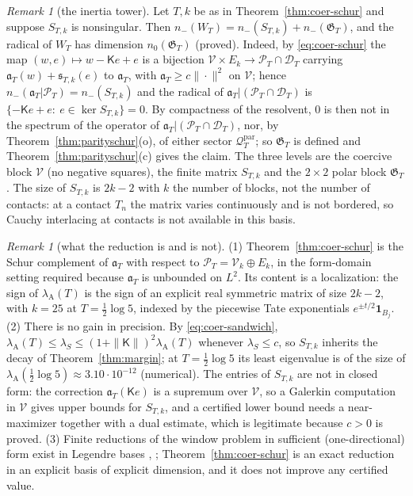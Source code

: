 \documentclass[11pt]{amsart}
\theoremstyle{definition}
\theoremstyle{remark}
\newtheorem{remark}[theorem]{Remark}
\newcommand{\PT}{\mathcal P_T}
\newcommand{\lamA}{\lambda_{\mathrm A}(T)}
\begin{document}
\begin{remark}[the inertia tower]\label{rem:inertiatower}
Let $T,k$ be as in Theorem~\ref{thm:coer-schur} and suppose $S_{T,k}$ is nonsingular. Then
$n_-(W_T)=n_-(S_{T,k})+n_-(\mathfrak G_T)$, and the radical of $W_T$ has dimension $n_0(\mathfrak G_T)$ (proved).
Indeed, by \eqref{eq:coer-schur} the map $(w,e)\mapsto w-\mathsf Ke+e$ is a bijection $\mathcal V\times E_k\to\PT\cap\mathcal D_T$
carrying $\mathfrak a_T(w)+\mathfrak s_{T,k}(e)$ to $\mathfrak a_T$, with $\mathfrak a_T\ge c\|\cdot\|^2$ on $\mathcal V$; hence
$n_-(\mathfrak a_T|\PT)=n_-(S_{T,k})$ and the radical of $\mathfrak a_T|(\PT\cap\mathcal D_T)$ is $\{-\mathsf Ke+e:\ e\in\ker S_{T,k}\}=0$.
By compactness of the resolvent, $0$ is then not in the spectrum of the operator of $\mathfrak a_T|(\PT\cap\mathcal D_T)$, nor,
by Theorem~\ref{thm:parityschur}(o), of either sector $\mathcal Q^{\mathrm{par}}_T$; so $\mathfrak G_T$ is defined and
Theorem~\ref{thm:parityschur}(c) gives the claim. The three levels are the coercive block $\mathcal V$ (no negative
squares), the finite matrix $S_{T,k}$ and the $2\times2$ polar block $\mathfrak G_T$. The size of $S_{T,k}$ is $2k-2$ with
$k$ the number of blocks, not the number of contacts: at a contact $T_n$ the matrix varies continuously and is not
bordered, so Cauchy interlacing at contacts is not available in this basis.
\end{remark}



\begin{remark}[what the reduction is and is not]\label{rem:coer-honest}
(1) Theorem~\ref{thm:coer-schur} is the Schur complement of $\mathfrak a_T$ with respect to
$\PT=\mathcal V_k\oplus E_k$, in the form-domain setting required because $\mathfrak a_T$ is unbounded on $L^2$.
Its content is a localization: the sign of $\lamA$ is the sign of an explicit real symmetric matrix of size
$2k-2$, with $k=25$ at $T=\frac12\log5$, indexed by the piecewise Tate exponentials $e^{\pm t/2}\mathbf 1_{B_j}$.
(2) There is no gain in precision. By \eqref{eq:coer-sandwich}, $\lamA\le\lambda_S\le(1+\|\mathsf K\|)^2\lamA$
whenever $\lambda_S\le c$, so $S_{T,k}$ inherits the decay of Theorem~\ref{thm:margin}; at $T=\frac12\log5$ its
least eigenvalue is of the size of $\lambda_{\mathrm A}(\frac12\log5)\approx3.10\cdot10^{-12}$ (numerical). The
entries of $S_{T,k}$ are not in closed form: the correction $\mathfrak a_T(\mathsf Ke)$ is a supremum over $\mathcal V$,
so a Galerkin computation in $\mathcal V$ gives upper bounds for $S_{T,k}$, and a certified lower bound needs a
near-maximizer together with a dual estimate, which is legitimate because $c>0$ is proved.
(3) Finite reductions of the window problem in sufficient (one-directional) form exist in Legendre bases
\cite[Thms.~1.1, 1.4]{Zhu2026}, \cite{Groskin2026}; Theorem~\ref{thm:coer-schur} is an exact reduction in an
explicit basis of explicit dimension, and it does not improve any certified value.
\end{remark}
\end{document}
